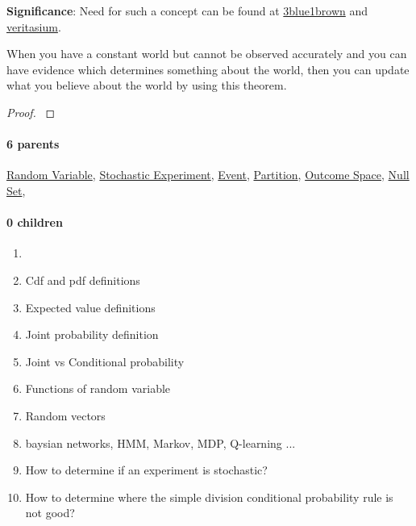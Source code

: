 \documentclass[../main.tex]{subfiles}
\begin{document}
\par
{\color{magenta} \textbf{Significance}:
Need for such a concept can be found at \href{https://youtu.be/HZGCoVF3YvM}{3blue1brown} and \href{https://youtu.be/R13BD8qKeTg}{veritasium}.

When you have a constant world but cannot be observed accurately and you can have evidence which determines something about the world, then you can update what you believe about the world by using this theorem.
\par}
\begin{proof}{\color{red} \todo}\end{proof}\par
\paragraph{6 parents} \hyperref[statement:Random Variable]{Random Variable}, \hyperref[statement:Stochastic Experiment]{Stochastic Experiment}, \hyperref[statement:Event]{Event}, \hyperref[statement:Partition]{Partition}, \hyperref[statement:Outcome Space]{Outcome Space}, \hyperref[statement:Null Set]{Null Set}, 
\paragraph{0 children} 


\begin{enumerate}[nolistsep]
  \item \todo
  \item Cdf and pdf definitions
  \item Expected value definitions
  \item Joint probability definition
  \item Joint vs Conditional probability
  \item Functions of random variable
  \item Random vectors
  \item baysian networks, HMM, Markov, MDP, Q-learning ...
  \item How to determine if an experiment is stochastic?
  \item How to determine where the simple division conditional probability rule is not good?
\end{enumerate}
\end{document}
